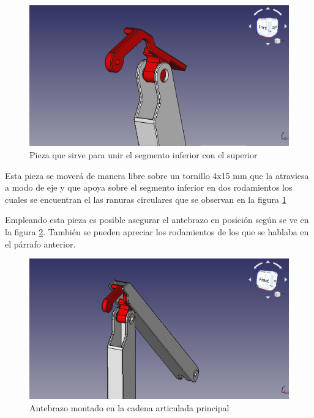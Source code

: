 \begin{figure}[H]
    \centering 
    \includegraphics[width=1\linewidth]{pictures/PiezaConFormaRara.png}
    \caption{Pieza que sirve para unir el segmento inferior con el superior}
    \label{fig:pieza_forma_rara}
\end{figure}

Esta pieza se moverá de manera libre sobre un tornillo 4x15 mm que la atraviesa a modo de eje y que apoya sobre el segmento inferior en dos rodamientos los cuales se encuentran el las ranuras circulares que se observan en la figura \ref{fig:pieza_forma_rara}

Empleando esta pieza es posible asegurar el antebrazo en posición según se ve en la figura \ref{fig:antebrazo}. También se pueden apreciar los rodamientos de los que se hablaba en el párrafo anterior.

\begin{figure}[H]
    \centering 
    \includegraphics[width=1\linewidth]{pictures/Antebrazo.png}
    \caption{Antebrazo montado en la cadena articulada principal}
    \label{fig:antebrazo}
\end{figure}

